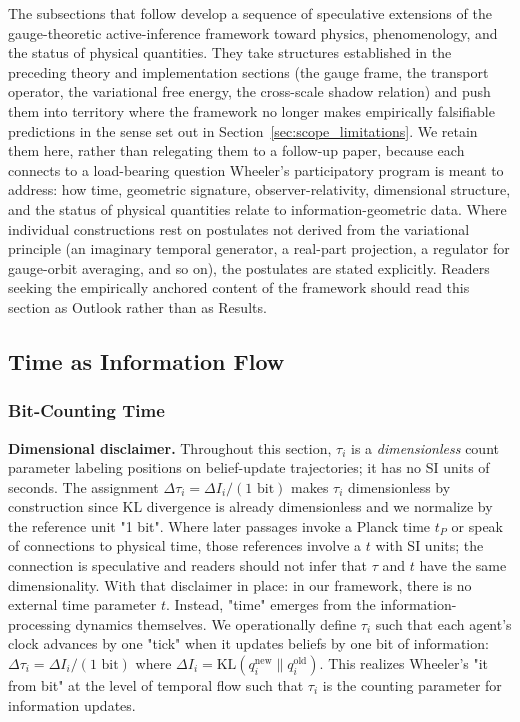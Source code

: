 \documentclass[11pt]{article}
\begin{document}
The subsections that follow develop a sequence of speculative extensions of the gauge-theoretic active-inference framework toward physics, phenomenology, and the status of physical quantities. They take structures established in the preceding theory and implementation sections (the gauge frame, the transport operator, the variational free energy, the cross-scale shadow relation) and push them into territory where the framework no longer makes empirically falsifiable predictions in the sense set out in Section~\ref{sec:scope_limitations}. We retain them here, rather than relegating them to a follow-up paper, because each connects to a load-bearing question Wheeler's participatory program is meant to address: how time, geometric signature, observer-relativity, dimensional structure, and the status of physical quantities relate to information-geometric data. Where individual constructions rest on postulates not derived from the variational principle (an imaginary temporal generator, a real-part projection, a regulator for gauge-orbit averaging, and so on), the postulates are stated explicitly. Readers seeking the empirically anchored content of the framework should read this section as Outlook rather than as Results.

\subsection{Time as Information Flow}

\subsubsection{Bit-Counting Time}

\textbf{Dimensional disclaimer.} Throughout this section, $\tau_i$ is a \emph{dimensionless} count parameter labeling positions on belief-update trajectories; it has no SI units of seconds. The assignment $\Delta \tau_i = \Delta I_i / (1\text{ bit})$ makes $\tau_i$ dimensionless by construction since KL divergence is already dimensionless and we normalize by the reference unit "1 bit". Where later passages invoke a Planck time $t_P$ or speak of connections to physical time, those references involve a $t$ with SI units; the connection is speculative and readers should not infer that $\tau$ and $t$ have the same dimensionality. With that disclaimer in place: in our framework, there is no external time parameter $t$. Instead, "time" emerges from the information-processing dynamics themselves. We operationally define $\tau_i$ such that each agent's clock advances by one "tick" when it updates beliefs by one bit of information: $\Delta \tau_i = \Delta I_i / (1 \text{ bit})$ where $\Delta I_i = \mathrm{KL}(q_i^{\text{new}} \| q_i^{\text{old}})$. This realizes Wheeler's "it from bit" at the level of temporal flow such that $\tau_i$ is the counting parameter for information updates.
\end{document}
